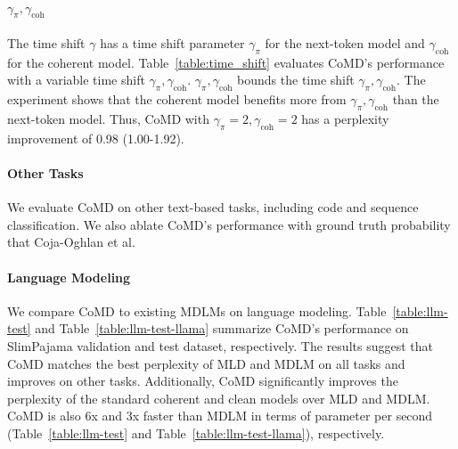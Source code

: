 \documentclass{article} %
\begin{document}
\paragraph{$\gamma_\pi,\gamma_\mathrm{coh}$}
The time shift $\gamma$ has a time shift parameter $\gamma_\pi$ for the next-token model and $\gamma_\mathrm{coh}$ for the coherent model. Table~\ref{table:time_shift} evaluates CoMD's performance with a variable time shift $\gamma_\pi,\gamma_\mathrm{coh}$. $\gamma_\pi,\gamma_\mathrm{coh}$ bounds the time shift $\gamma_\pi,\gamma_\mathrm{coh}$. The experiment shows that the coherent model benefits more from $\gamma_\pi,\gamma_\mathrm{coh}$ than the next-token model. Thus, CoMD with $\gamma_\pi=2,\gamma_\mathrm{coh}=2$ has a perplexity improvement of 0.98 (1.00-1.92). 


\paragraph{Other Tasks}
We evaluate CoMD on other text-based tasks, including code and sequence classification. We also ablate CoMD's performance with ground truth probability that Coja-Oghlan et al.~\citep{coja2020replica} 
\paragraph{Language Modeling}
We compare CoMD to existing MDLMs on language modeling. Table~\ref{table:llm-test} and Table~\ref{table:llm-test-llama} summarize CoMD's performance on SlimPajama validation and test dataset, respectively. The results suggest that CoMD matches the best perplexity of MLD and MDLM on all tasks and improves on other tasks. Additionally, CoMD significantly improves the perplexity of the standard coherent and clean models over MLD and MDLM. CoMD is also 6x and 3x faster than MDLM in terms of parameter per second (Table~\ref{table:llm-test} and Table~\ref{table:llm-test-llama}), respectively. 

\end{document}
